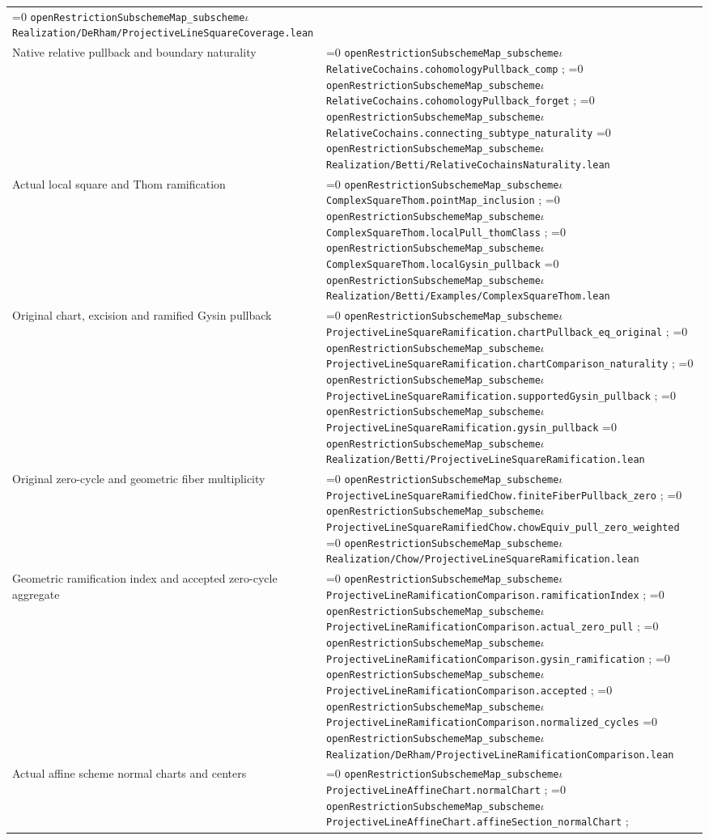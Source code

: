 \documentclass[11pt]{article}
\theoremstyle{definition}
\theoremstyle{remark}
\newcommand{\leanpath}[1]{%
  \ifnum\pdfstrcmp{\detokenize{#1}}%
      {\detokenize{openRestrictionSubschemeMap_subschemeι}}=0
    \texttt{\nolinkurl{openRestrictionSubschemeMap_subscheme}}\ensuremath{\iota}%
  \else
    \texttt{\nolinkurl{#1}}%
  \fi}
\begin{document}
\begin{longtable}{@{}>{\raggedright\arraybackslash}p{}
                >{\raggedright\arraybackslash}p{}@{}}
{\footnotesize\leanpath{ProjectiveLineSquareCoverage.model_satisfies_from_square_cover}}\newline
\leanpath{Realization/DeRham/ProjectiveLineSquareCoverage.lean}\\
Native relative pullback and boundary naturality &
\leanpath{RelativeCochains.cohomologyPullback_comp};
\leanpath{RelativeCochains.cohomologyPullback_forget};
\leanpath{RelativeCochains.connecting_subtype_naturality}\newline
\leanpath{Realization/Betti/RelativeCochainsNaturality.lean}\\
Actual local square and Thom ramification &
\leanpath{ComplexSquareThom.pointMap_inclusion};
\leanpath{ComplexSquareThom.localPull_thomClass};
\leanpath{ComplexSquareThom.localGysin_pullback}\newline
\leanpath{Realization/Betti/Examples/ComplexSquareThom.lean}\\
Original chart, excision and ramified Gysin pullback &
\leanpath{ProjectiveLineSquareRamification.chartPullback_eq_original};
\leanpath{ProjectiveLineSquareRamification.chartComparison_naturality};
\leanpath{ProjectiveLineSquareRamification.supportedGysin_pullback};
\leanpath{ProjectiveLineSquareRamification.gysin_pullback}\newline
\leanpath{Realization/Betti/ProjectiveLineSquareRamification.lean}\\
Original zero-cycle and geometric fiber multiplicity &
\leanpath{ProjectiveLineSquareRamifiedChow.finiteFiberPullback_zero};\newline
{\footnotesize\leanpath{ProjectiveLineSquareRamifiedChow.chowEquiv_pull_zero_weighted}}\newline
\leanpath{Realization/Chow/ProjectiveLineSquareRamification.lean}\\
Geometric ramification index and accepted zero-cycle aggregate &
\leanpath{ProjectiveLineRamificationComparison.ramificationIndex};
\leanpath{ProjectiveLineRamificationComparison.actual_zero_pull};
\leanpath{ProjectiveLineRamificationComparison.gysin_ramification};
\leanpath{ProjectiveLineRamificationComparison.accepted};
\leanpath{ProjectiveLineRamificationComparison.normalized_cycles}\newline
\leanpath{Realization/DeRham/ProjectiveLineRamificationComparison.lean}\\
Actual affine scheme normal charts and centers &
\leanpath{ProjectiveLineAffineChart.normalChart};\newline
\leanpath{ProjectiveLineAffineChart.affineSection_normalChart};\newline

\end{longtable}
\end{document}

